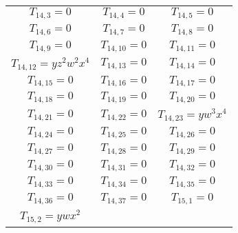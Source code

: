 \begin{longtable}{|c|c|c|}
$T_{14,3}= 0$&

$T_{14,4}= 0$&

$T_{14,5}= 0$\\

$T_{14,6}= 0$&

$T_{14,7}= 0$&

$T_{14,8}= 0$\\

$T_{14,9}= 0$&

$T_{14,10}= 0$&

$T_{14,11}= 0$\\

$T_{14,12}= yz^2w^2x^4$&

$T_{14,13}= 0$&

$T_{14,14}= 0$\\

$T_{14,15}= 0$&

$T_{14,16}= 0$&

$T_{14,17}= 0$\\

$T_{14,18}= 0$&

$T_{14,19}= 0$&

$T_{14,20}= 0$\\

$T_{14,21}= 0$&

$T_{14,22}= 0$&

$T_{14,23}= yw^3x^4$\\

$T_{14,24}= 0$&

$T_{14,25}= 0$&

$T_{14,26}= 0$\\

$T_{14,27}= 0$&

$T_{14,28}= 0$&

$T_{14,29}= 0$\\

$T_{14,30}= 0$&

$T_{14,31}= 0$&

$T_{14,32}= 0$\\

$T_{14,33}= 0$&

$T_{14,34}= 0$&

$T_{14,35}= 0$\\

$T_{14,36}= 0$&

$T_{14,37}= 0$&

$T_{15,1}= 0$\\

$T_{15,2}= ywx^2$&


\end{longtable}
